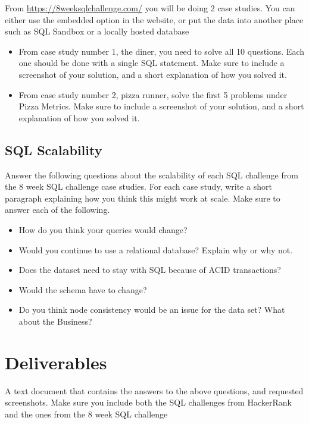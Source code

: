 \documentclass[12pt]{article}
\begin{document}
    From \url{https://8weeksqlchallenge.com/} you will be doing 2 case studies.  You can either use the embedded option in the website, or put the data into another place such as SQL Sandbox or a locally hosted database
\begin{itemize}
    \item From case study number 1, the diner, you need to solve all 10 questions.  Each one should be done with a single SQL statement.  Make sure to include a screenshot of your solution, and a short explanation of how you solved it. 
    \item From case study number 2, pizza runner, solve the first 5 problems under Pizza Metrics.  Make sure to include a screenshot of your solution, and a short explanation of how you solved it.
\end{itemize}

\subsection*{SQL Scalability}
 Answer the following questions about the scalability of each SQL challenge from the 8 week SQL challenge case studies. For each case study, write a short paragraph explaining how you think this might work at scale. Make sure to answer each of the following.

\begin{itemize}
  \item How do you think your queries would change? 
  \item Would you continue to use a relational database? Explain why or why not. 
  \item Does the dataset need to stay with SQL because of ACID transactions?
  \item Would the schema have to change?
  \item Do you think node consistency would be an issue for the data set? What about the Business?
\end{itemize}

\section*{Deliverables}
A text document that contains the answers to the above questions, and requested screenshots.  Make sure you include both the SQL challenges from HackerRank and the ones from the 8 week SQL challenge
\end{document}
